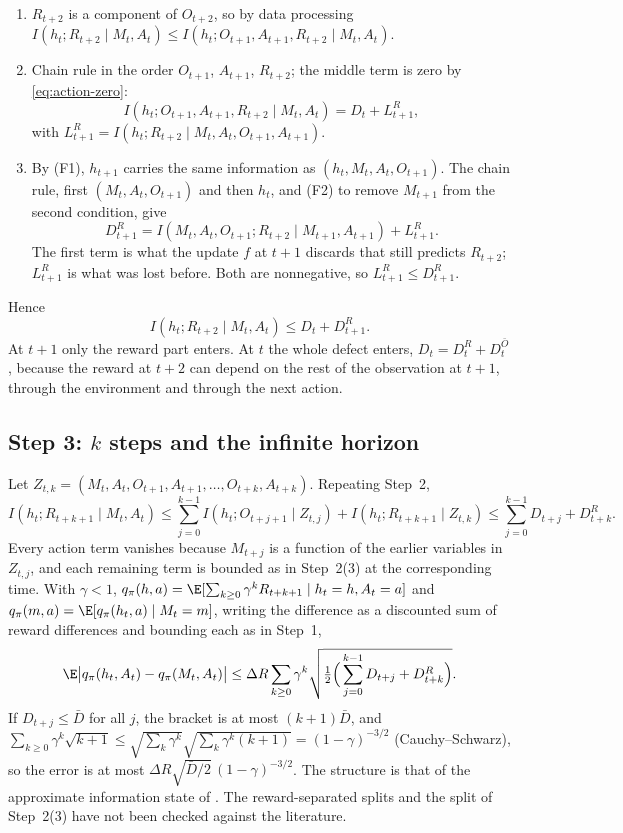 \begin{enumerate}
\item $R_{t+2}$ is a component of $O_{t+2}$, so by data processing $I(h_t;R_{t+2}\mid M_t,A_t)\le I(h_t;O_{t+1},A_{t+1},R_{t+2}\mid M_t,A_t)$.
\item Chain rule in the order $O_{t+1}$, $A_{t+1}$, $R_{t+2}$; the middle term is zero by \eqref{eq:action-zero}:
\[
I(h_t;O_{t+1},A_{t+1},R_{t+2}\mid M_t,A_t)=D_t+L^R_{t+1},
\]
with $L^R_{t+1}=I(h_t;R_{t+2}\mid M_t,A_t,O_{t+1},A_{t+1})$.
\item By (F1), $h_{t+1}$ carries the same information as $(h_t,M_t,A_t,O_{t+1})$. The chain rule, first $(M_t,A_t,O_{t+1})$ and then $h_t$, and (F2) to remove $M_{t+1}$ from the second condition, give
\[
D^R_{t+1}=I(M_t,A_t,O_{t+1};R_{t+2}\mid M_{t+1},A_{t+1})+L^R_{t+1}.
\]
The first term is what the update $f$ at $t+1$ discards that still predicts $R_{t+2}$; $L^R_{t+1}$ is what was lost before. Both are nonnegative, so $L^R_{t+1}\le D^R_{t+1}$.
\end{enumerate}
Hence
\[
I(h_t;R_{t+2}\mid M_t,A_t)\le D_t+D^R_{t+1}.
\]
At $t+1$ only the reward part enters. At $t$ the whole defect enters, $D_t=D^R_t+D^{\bar O}_t$, because the reward at $t+2$ can depend on the rest of the observation at $t+1$, through the environment and through the next action.

\subsection{Step 3: $k$ steps and the infinite horizon}

Let $Z_{t,k}=(M_t,A_t,O_{t+1},A_{t+1},\dots,O_{t+k},A_{t+k})$. Repeating Step~2,
\[
I(h_t;R_{t+k+1}\mid M_t,A_t)\le\sum_{j=0}^{k-1}I(h_t;O_{t+j+1}\mid Z_{t,j})+I(h_t;R_{t+k+1}\mid Z_{t,k})\le\sum_{j=0}^{k-1}D_{t+j}+D^R_{t+k}.
\]
Every action term vanishes because $M_{t+j}$ is a function of the earlier variables in $Z_{t,j}$, and each remaining term is bounded as in Step~2(3) at the corresponding time.
With $\gamma<1$, $q_\pi(h,a)=\E[\sum_{k\ge0}\gamma^kR_{t+k+1}\mid h_t=h,A_t=a]$ and $q_\pi(m,a)=\E[q_\pi(h_t,a)\mid M_t=m]$, writing the difference as a discounted sum of reward differences and bounding each as in Step~1,
\[
\E\big|q_\pi(h_t,A_t)-q_\pi(M_t,A_t)\big|\le\Delta R\sum_{k\ge0}\gamma^k\sqrt{\tfrac12\Big(\sum_{j=0}^{k-1}D_{t+j}+D^R_{t+k}\Big)} .
\]
If $D_{t+j}\le\bar D$ for all $j$, the bracket is at most $(k+1)\bar D$, and $\sum_{k\ge0}\gamma^k\sqrt{k+1}\le\sqrt{\sum_k\gamma^k}\sqrt{\sum_k\gamma^k(k+1)}=(1-\gamma)^{-3/2}$ (Cauchy--Schwarz), so the error is at most $\Delta R\sqrt{\bar D/2}\,(1-\gamma)^{-3/2}$. The structure is that of the approximate information state of \citet{subramanian2022approximate}. The reward-separated splits and the split of Step~2(3) have not been checked against the literature.

